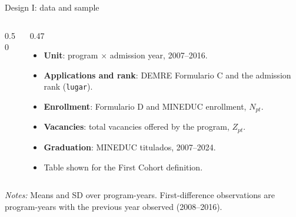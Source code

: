 \documentclass{beamer}
\begin{document}
\begin{frame}{Design I: data and sample}
\begin{columns}[T,onlytextwidth]
\begin{column}{0.50\textwidth}
\centering
\tiny
\resizebox{\linewidth}{!}{}
\end{column}
\begin{column}{0.47\textwidth}
\scriptsize
\begin{itemize}
    \setlength{\itemsep}{3pt}
    \item \textbf{Unit}: program $\times$ admission year, 2007--2016.
    \item \textbf{Applications and rank}: DEMRE Formulario C and the admission rank (\texttt{lugar}).
    \item \textbf{Enrollment}: Formulario D and MINEDUC enrollment, $N_{pt}$.
    \item \textbf{Vacancies}: total vacancies offered by the program, $Z_{pt}$.
    \item \textbf{Graduation}: MINEDUC titulados, 2007--2024.
    \item Table shown for the First Cohort definition.
\end{itemize}
\end{column}
\end{columns}

\vspace{0.1cm}
\parbox{0.97\textwidth}{\tiny \textit{Notes:} Means and SD over program-years. First-difference observations are program-years with the previous year observed (2008--2016).}
\end{frame}
\end{document}
